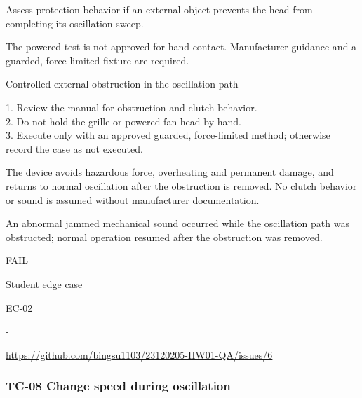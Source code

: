 \begin{description}[style=nextline,leftmargin=3.2cm]

\item[Objective] Assess protection behavior if an external object prevents the head from completing its oscillation sweep.

\item[Preconditions] The powered test is not approved for hand contact. Manufacturer guidance and a guarded, force-limited fixture are required.

\item[Input] Controlled external obstruction in the oscillation path

\item[Steps] 1. Review the manual for obstruction and clutch behavior.\\ 2. Do not hold the grille or powered fan head by hand.\\ 3. Execute only with an approved guarded, force-limited method; otherwise record the case as not executed.

\item[Expected] The device avoids hazardous force, overheating and permanent damage, and returns to normal oscillation after the obstruction is removed. No clutch behavior or sound is assumed without manufacturer documentation.

\item[Actual] An abnormal jammed mechanical sound occurred while the oscillation path was obstructed; normal operation resumed after the obstruction was removed.

\item[Verdict] FAIL

\item[Source] Student edge case

\item[Edge case] EC-02

\item[Video] -

\item[Issue] \url{https://github.com/bingsu1103/23120205-HW01-QA/issues/6}

\end{description}

\clearpage

\subsubsection{TC-08 Change speed during oscillation}

